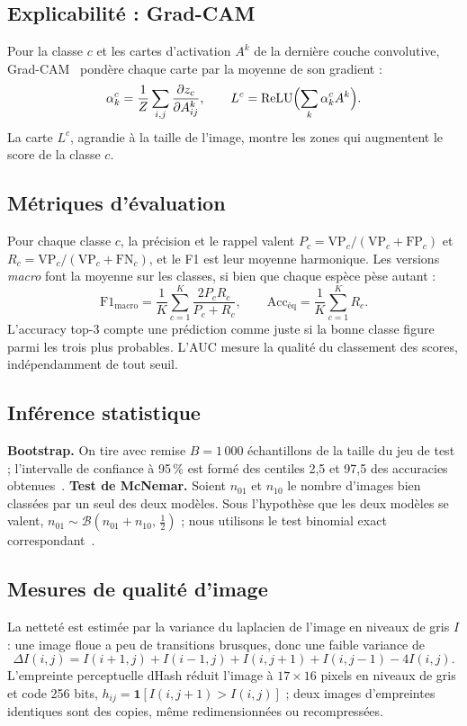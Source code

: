 \documentclass[conference]{IEEEtran}
\begin{document}
\subsection{Explicabilité : Grad-CAM}
Pour la classe $c$ et les cartes d'activation $A^k$ de la dernière couche convolutive, Grad-CAM~\cite{selvaraju2017} pondère chaque carte par la moyenne de son gradient :
\begin{equation}
\alpha_k^c = \frac{1}{Z}\sum_{i,j} \frac{\partial z_c}{\partial A^k_{ij}},\qquad L^c = \mathrm{ReLU}\Bigl(\sum_k \alpha_k^c A^k\Bigr).
\end{equation}
La carte $L^c$, agrandie à la taille de l'image, montre les zones qui augmentent le score de la classe $c$.

\subsection{Métriques d'évaluation}
Pour chaque classe $c$, la précision et le rappel valent $P_c = \mathrm{VP}_c / (\mathrm{VP}_c + \mathrm{FP}_c)$ et $R_c = \mathrm{VP}_c / (\mathrm{VP}_c + \mathrm{FN}_c)$, et le F1 est leur moyenne harmonique. Les versions \emph{macro} font la moyenne sur les classes, si bien que chaque espèce pèse autant :
\begin{equation}
\mathrm{F1}_{\mathrm{macro}} = \frac{1}{K}\sum_{c=1}^{K} \frac{2 P_c R_c}{P_c + R_c},\qquad \mathrm{Acc}_{\mathrm{éq}} = \frac{1}{K}\sum_{c=1}^{K} R_c .
\end{equation}
L'accuracy top-3 compte une prédiction comme juste si la bonne classe figure parmi les trois plus probables. L'AUC mesure la qualité du classement des scores, indépendamment de tout seuil.

\subsection{Inférence statistique}
\textbf{Bootstrap.} On tire avec remise $B = 1\,000$ échantillons de la taille du jeu de test ; l'intervalle de confiance à 95\,\% est formé des centiles 2,5 et 97,5 des accuracies obtenues~\cite{efron1979}.
\textbf{Test de McNemar.} Soient $n_{01}$ et $n_{10}$ le nombre d'images bien classées par un seul des deux modèles. Sous l'hypothèse que les deux modèles se valent, $n_{01} \sim \mathcal{B}(n_{01}+n_{10},\, \tfrac12)$ ; nous utilisons le test binomial exact correspondant~\cite{mcnemar1947}.

\subsection{Mesures de qualité d'image}
La netteté est estimée par la variance du laplacien de l'image en niveaux de gris $I$ : une image floue a peu de transitions brusques, donc une faible variance de
\begin{equation}
\Delta I(i,j) = I(i{+}1,j) + I(i{-}1,j) + I(i,j{+}1) + I(i,j{-}1) - 4 I(i,j).
\end{equation}
L'empreinte perceptuelle dHash réduit l'image à $17{\times}16$ pixels en niveaux de gris et code 256 bits, $h_{ij} = \mathbf{1}[I(i, j{+}1) > I(i, j)]$ ; deux images d'empreintes identiques sont des copies, même redimensionnées ou recompressées.
\end{document}
